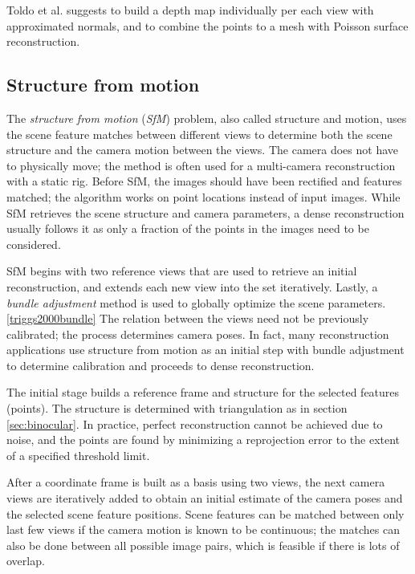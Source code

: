 Toldo et al. suggests to build a depth map individually per each view with approximated normals, and to combine the points to a mesh with Poisson surface reconstruction. \cite{toldo2013accurate,toldo2013towards}


\subsection{Structure from motion} %


The \emph{structure from motion} (\emph{SfM}) problem, also called structure and motion, uses the scene feature matches between different views to determine both the scene structure and the camera motion between the views.
\cite{snavely2006photo,fitzgibbon1998automatic} 
The camera does not have to physically move; the method is often used for a multi-camera reconstruction with a static rig.
Before SfM, the images should have been rectified and features matched; the algorithm works on point locations instead of input images.
While SfM retrieves the scene structure and camera parameters, a dense reconstruction usually follows it as only a fraction of the points in the images need to be considered.

SfM begins with two reference views that are used to retrieve an initial reconstruction, and extends each new view into the set iteratively.
Lastly, a \emph{bundle adjustment} method is used to globally optimize the scene parameters. \ref{triggs2000bundle}
The relation between the views need not be previously calibrated; the process determines camera poses.
In fact, many reconstruction applications use structure from motion as an initial step with bundle adjustment to determine calibration and proceeds to dense reconstruction.

The initial stage builds a reference frame and structure for the selected features (points).
The structure is determined with triangulation as in section \ref{sec:binocular}.
In practice, perfect reconstruction cannot be achieved due to noise, and the points are found by minimizing a reprojection error to the extent of a specified threshold limit.

After a coordinate frame is built as a basis using two views, the next camera views are iteratively added to obtain an initial estimate of the camera poses and the selected scene feature positions.
Scene features can be matched between only last few views if the camera motion is known to be continuous;
the matches can also be done between all possible image pairs, which is feasible if there is lots of overlap.

